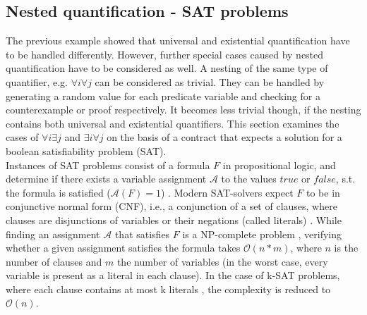 \subsection{Nested quantification - SAT problems}
The previous example showed that universal and existential quantification have to be handled differently. However, further special cases caused by nested quantification have to be considered as well. A nesting of the same type of quantifier, e.g. $\forall i \forall j$ can be considered as trivial. They can be handled by generating a random value for each predicate variable and checking for a counterexample or proof respectively. It becomes less trivial though, if the nesting contains both universal and existential quantifiers. This section examines the cases of $\forall i \exists j$ and $\exists i \forall j$ on the basis of a contract that expects a solution for a boolean satisfiability problem (SAT). \\

Instances of SAT problems consist of a formula $F$ in propositional logic, and determine if there exists a variable assignment $\mathcal{A}$ to the values $true$ or $false$, s.t. the formula is satisfied ($\mathcal{A}(F) = 1$) \cite{Biere2009}. Modern SAT-solvers expect $F$ to be in conjunctive normal form (CNF), i.e., a conjunction of a set of clauses, where clauses are disjunctions of variables or their negations (called literals) \cite{cnf_math_encycl}. While finding an assignment $\mathcal{A}$ that satisfies $F$ is a NP-complete problem \cite{Biere2009}, verifying whether a given assignment satisfies the formula takes $\mathcal{O}(n*m)$, where $n$ is the number of clauses and $m$ the number of variables (in the worst case, every variable is present as a literal in each clause). In the case of k-SAT problems, where each clause contains at most k literals \cite{Biere2009}, the complexity is reduced to $\mathcal{O}(n)$.

